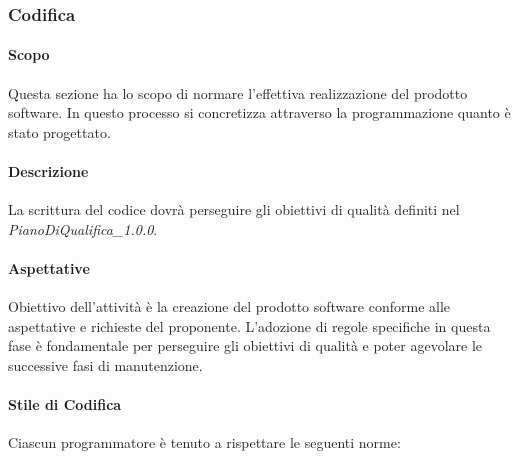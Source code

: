 \subsubsection{Codifica}
\paragraph{Scopo}
Questa sezione ha lo scopo di normare l'effettiva realizzazione del prodotto software.  In questo processo si concretizza attraverso la programmazione quanto è stato progettato.

\paragraph{Descrizione}
La scrittura del codice dovrà perseguire gli obiettivi di qualità definiti nel \textit{PianoDiQualifica\_1.0.0}.

\paragraph{Aspettative}
Obiettivo dell'attività è la creazione del prodotto software conforme alle aspettative e richieste del proponente.  L'adozione di regole specifiche in questa fase è fondamentale per perseguire gli obiettivi di qualità e poter agevolare le successive fasi di manutenzione.

\paragraph{Stile di Codifica}
Ciascun programmatore è tenuto a rispettare le seguenti norme:

